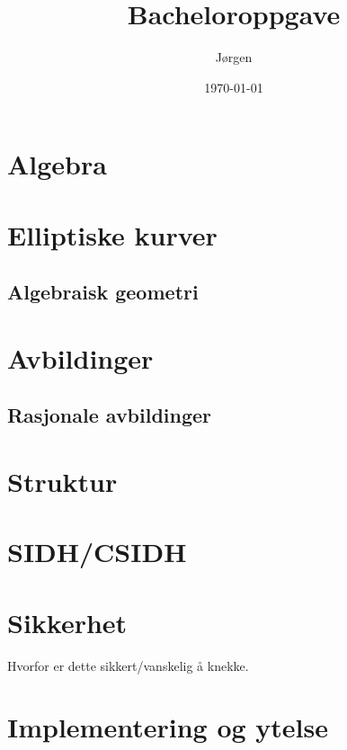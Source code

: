 \documentclass[norsk]{article}
\title{Bacheloroppgave}
\author{Jørgen}
\date{\today}
\theoremstyle{definition}
\begin{document}
\maketitle

\tableofcontents

\newpage


\section{Algebra}


\section{Elliptiske kurver}
\subsection{Algebraisk geometri}


%

\section{Avbildinger}
\subsection{Rasjonale avbildinger}



\section{Struktur}


\section{SIDH/CSIDH}


\section{Sikkerhet}
Hvorfor er dette sikkert/vanskelig å knekke.

\section{Implementering og ytelse}
 
 
% 

\clearpage
 
\printglossary

\printbibliography
\end{document}
